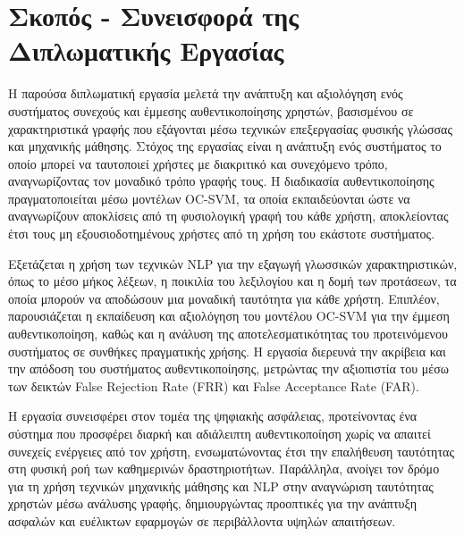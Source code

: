 \section{Σκοπός - Συνεισφορά της Διπλωματικής Εργασίας}
\label{section:contribution}

Η παρούσα διπλωματική εργασία μελετά την ανάπτυξη και αξιολόγηση ενός συστήματος συνεχούς και έμμεσης αυθεντικοποίησης χρηστών, βασισμένου σε χαρακτηριστικά γραφής που εξάγονται μέσω τεχνικών επεξεργασίας φυσικής γλώσσας και μηχανικής μάθησης. Στόχος της εργασίας είναι η ανάπτυξη ενός συστήματος το οποίο μπορεί να ταυτοποιεί χρήστες με διακριτικό και συνεχόμενο τρόπο, αναγνωρίζοντας τον μοναδικό τρόπο γραφής τους. Η διαδικασία αυθεντικοποίησης πραγματοποιείται μέσω μοντέλων OC-SVM, τα οποία εκπαιδεύονται ώστε να αναγνωρίζουν αποκλίσεις από τη φυσιολογική γραφή του κάθε χρήστη, αποκλείοντας έτσι τους μη εξουσιοδοτημένους χρήστες από τη χρήση του εκάστοτε συστήματος.

Εξετάζεται η χρήση των τεχνικών NLP για την εξαγωγή γλωσσικών χαρακτηριστικών, όπως το μέσο μήκος λέξεων, η ποικιλία του λεξιλογίου και η δομή των προτάσεων, τα οποία μπορούν να αποδώσουν μια μοναδική ταυτότητα για κάθε χρήστη. Επιπλέον, παρουσιάζεται η εκπαίδευση και αξιολόγηση του μοντέλου OC-SVM για την έμμεση αυθεντικοποίηση, καθώς και η ανάλυση της αποτελεσματικότητας του προτεινόμενου συστήματος σε συνθήκες πραγματικής χρήσης. Η εργασία διερευνά την ακρίβεια και την απόδοση του συστήματος αυθεντικοποίησης, μετρώντας την αξιοπιστία του μέσω των δεικτών False Rejection Rate (FRR) και False Acceptance Rate (FAR).

Η εργασία συνεισφέρει στον τομέα της ψηφιακής ασφάλειας, προτείνοντας ένα σύστημα που προσφέρει διαρκή και αδιάλειπτη αυθεντικοποίηση χωρίς να απαιτεί συνεχείς ενέργειες από τον χρήστη, ενσωματώνοντας έτσι την επαλήθευση ταυτότητας στη φυσική ροή των καθημερινών δραστηριοτήτων. Παράλληλα, ανοίγει τον δρόμο για τη χρήση τεχνικών μηχανικής μάθησης και NLP στην αναγνώριση ταυτότητας χρηστών μέσω ανάλυσης γραφής, δημιουργώντας προοπτικές για την ανάπτυξη ασφαλών και ευέλικτων εφαρμογών σε περιβάλλοντα υψηλών απαιτήσεων.
